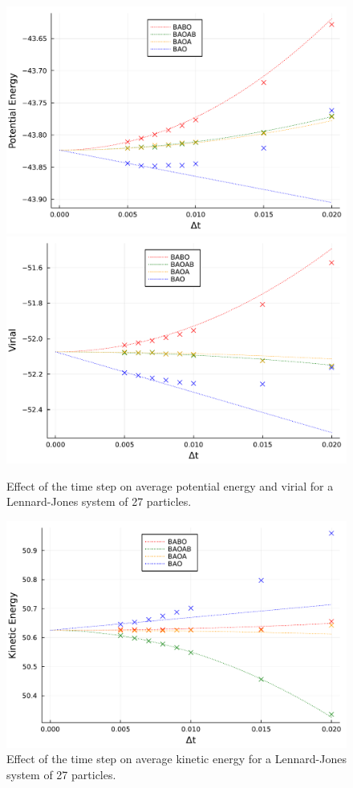\begin{figure}[htbp]
    \begin{center}
      \includegraphics[width=0.49\linewidth]{figures/chapter1/potential_energy_bias.pdf}
      \includegraphics[width=0.49\linewidth]{figures/chapter1/virial_bias.pdf}
      \caption{ \label{fig:configurational_bias}
        Effect of the time step on average potential energy and virial for a Lennard-Jones system of 27 particles.
      }
    \end{center}
  \end{figure}

  \begin{figure}[htbp]
    \begin{center}
      \includegraphics[width=0.7\linewidth]{figures/chapter1/kinetic_energy_bias.pdf}
      \caption{ \label{fig:kinetic_energy_bias}
        Effect of the time step on average kinetic energy for a Lennard-Jones system of 27 particles.
      }
    \end{center}
  \end{figure}

